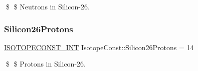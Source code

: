 \$ \$ Neutrons in Silicon-\/26. \mbox{\label{group___isotope_const-_silicon-_si26_gab6733b350ae19180b42fced87aaba6c1}} 
\subsubsection{\texorpdfstring{Silicon26\+Protons}{Silicon26Protons}}
{\footnotesize\ttfamily \mbox{\hyperlink{group___isotope_const-_macros_ga5f18360b3e99483a35c32d789e62621c}{I\+S\+O\+T\+O\+P\+E\+C\+O\+N\+S\+T\+\_\+\+I\+NT}} Isotope\+Const\+::\+Silicon26\+Protons = 14}

\$ \$ Protons in Silicon-\/26. 